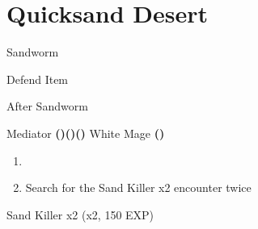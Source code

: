 \chapter{Quicksand Desert}

\vspace{\baselineskip}

\begin{paracol}{2}

\begin{boss}{Sandworm}
    \varwb
    \begin{round}{1}
        \bartz Defend
        \faris Item \then {} \then \leftCommand{\throw} \then \waterScroll
        \lenna \leftCommand{\throw} \then \waterScroll
        \item {}
        \vspace{1mm}
        \item[] 
        \galuf \leftCommand{\throw} \then \waterScroll
    \end{round}
    \varwe
\end{boss}

\begin{menu}{After Sandworm}
    \varwb
    \begin{abilityMenu}
        \bartz \ability{!\escape} \optimize
    \end{abilityMenu}
    \begin{jobMenu}
        \lenna Mediator \textbf{(\pointDown)(\pointLeft)(\pointDown)}
        \galuf White Mage \textbf{(\pointDown)}
    \end{jobMenu}
    \begin{magicMenu}
        \galuf \cure \space \then {}
    \end{magicMenu}
    \varwe
\end{menu}

\begin{enumerate}
    \item {}
    \item Search for the Sand Killer x2 encounter twice
\end{enumerate}

\begin{encounter}{Sand Killer x2 (x2, 150 EXP)}
	\varwb
	\begin{notes}
		\item {}
	\end{notes}
	\begin{round}{1}
		\faris \leftCommand{\throw} \then \waterScroll
	\end{round}
	\varwe
\end{encounter}


\end{paracol}

